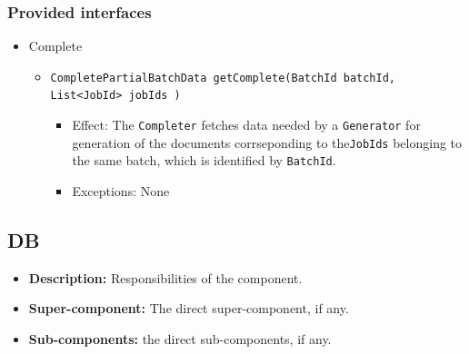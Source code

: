\documentclass[a4paper,10pt]{article}
\begin{document}
\subsubsection*{Provided interfaces}
\begin{itemize}
    \item Complete
    \begin{itemize}
        \item \texttt{CompletePartialBatchData getComplete(BatchId batchId, List<JobId> jobIds )}
        \begin{itemize}
            \item Effect: The \texttt{Completer} fetches data needed by a \texttt{Generator} for generation of the documents corrseponding to the\texttt{JobIds} belonging to the same batch, which is identified by \texttt{BatchId}.
            \item Exceptions: None
        \end{itemize}
    \end{itemize}
\end{itemize}

\subsection{DB}
\begin{itemize}
    \item \textbf{Description:} Responsibilities of the component.
    \item \textbf{Super-component:} The direct super-component, if any.
    \item \textbf{Sub-components:} the direct sub-components, if any.
\end{itemize}
\end{document}

